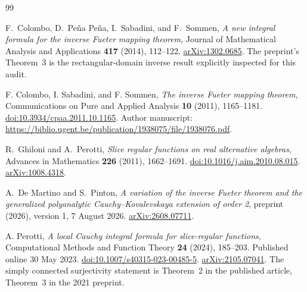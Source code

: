 \documentclass[11pt,a4paper]{article}
\numberwithin{equation}{section}
\theoremstyle{definition}
\theoremstyle{remark}
\theoremstyle{plain}
\begin{document}
\begin{thebibliography}{99}


F.~Colombo, D.~Pe\~na Pe\~na, I.~Sabadini, and F.~Sommen, \emph{A new integral formula for the inverse Fueter mapping theorem}, Journal of Mathematical Analysis and Applications \textbf{417} (2014), 112--122. \href{https://arxiv.org/abs/1302.0685}{arXiv:1302.0685}. The preprint's Theorem~3 is the rectangular-domain inverse result explicitly inspected for this audit.

F. Colombo, I. Sabadini, and F. Sommen, \emph{The inverse Fueter mapping theorem}, Communications on Pure and Applied Analysis \textbf{10} (2011), 1165--1181. \href{https://doi.org/10.3934/cpaa.2011.10.1165}{doi:10.3934/cpaa.2011.10.1165}. Author manuscript: \url{https://biblio.ugent.be/publication/1938075/file/1938076.pdf}.

R.~Ghiloni and A.~Perotti, \emph{Slice regular functions on real alternative algebras}, Advances in Mathematics \textbf{226} (2011), 1662--1691. \href{https://doi.org/10.1016/j.aim.2010.08.015}{doi:10.1016/j.aim.2010.08.015}. \href{https://arxiv.org/abs/1008.4318}{arXiv:1008.4318}.

A.~De Martino and S.~Pinton, \emph{A variation of the inverse Fueter theorem and the generalized polyanalytic Cauchy--Kovalevskaya extension of order 2}, preprint (2026), version 1, 7 August 2026. \href{https://arxiv.org/abs/2608.07711}{arXiv:2608.07711}.

A. Perotti, \emph{A local Cauchy integral formula for slice-regular functions}, Computational Methods and Function Theory \textbf{24} (2024), 185--203. Published online 30 May 2023. \href{https://doi.org/10.1007/s40315-023-00485-5}{doi:10.1007/s40315-023-00485-5}. \href{https://arxiv.org/abs/2105.07041}{arXiv:2105.07041}. The simply connected surjectivity statement is Theorem~2 in the published article, Theorem~3 in the 2021 preprint.


\end{thebibliography}
\end{document}
